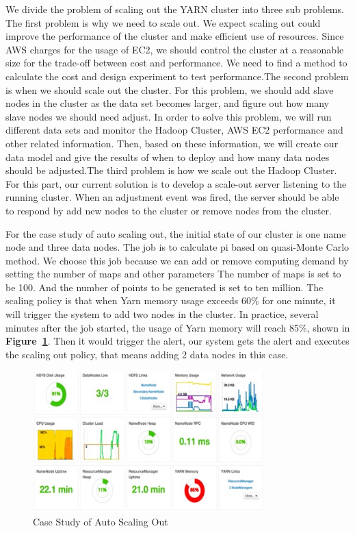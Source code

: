 \documentclass{article}
\begin{document}
We divide the problem of scaling out the YARN cluster into three sub problems. The first problem is why we need to scale out. We expect scaling out could improve the performance of the cluster and make efficient use of resources. Since AWS charges for the usage of EC2, we should control the cluster at a reasonable size for the trade-off between cost and performance. We need to find a method to calculate the cost and design experiment to test performance.The second problem is when we should scale out the cluster. For this problem, we should add slave nodes in the cluster as the data set becomes larger, and figure out how many slave nodes we should need adjust. In order to solve this problem, we will run different data sets and monitor the Hadoop Cluster, AWS EC2 performance and other related information. Then, based on these information, we will create our data model and give the results of when to deploy and how many data nodes should be adjusted.The third problem is how we scale out the Hadoop Cluster. For this part, our current solution is to develop a scale-out server listening to the running cluster. When an adjustment event was fired, the server should be able to respond by add new nodes to the cluster or remove nodes from the cluster.
 
For the case study of auto scaling out, the initial state of our cluster is one name node and three data nodes. The job is to calculate pi based on quasi-Monte Carlo method. We choose this job because we can add or remove computing demand by setting the number of maps and other parameters The number of maps is set to be 100. And the number of points to be generated is set to  ten million. The scaling policy is that when Yarn memory usage exceeds 60\% for one minute, it will trigger the system to add two nodes in the cluster. In practice, several minutes after the job started, the usage of Yarn memory will reach 85\%, shown in \textbf{Figure~\ref{fig:autoscalingout}}. Then it would trigger the alert,  our system gets the alert and executes the scaling out policy, that means adding 2 data nodes in this case. 
 \begin{figure}[ht!]
 \centering
 \includegraphics[width=0.8\textwidth,natwidth=1000,natheight=800]{caseScaleOut.png}
 \caption{Case Study of Auto Scaling Out}
 \label{fig:autoscalingout}
 \end{figure}
 
\end{document}
